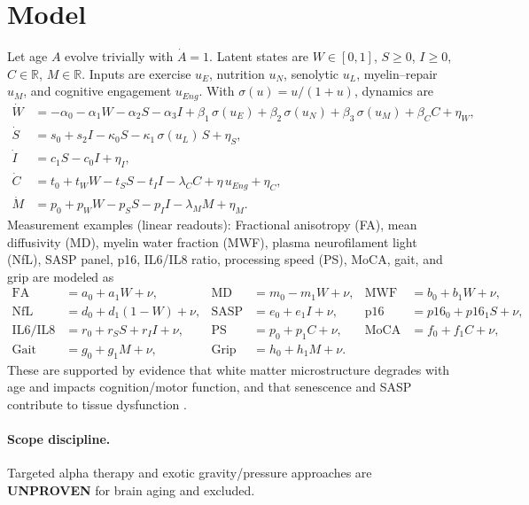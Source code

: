 \documentclass[11pt]{article}
\begin{document}
\section{Model}
Let age \(A\) evolve trivially with \(\dot A=1\). Latent states are \(W\in[0,1]\), \(S\ge0\), \(I\ge0\), \(C\in\mathbb{R}\), \(M\in\mathbb{R}\). Inputs are exercise \(u_E\), nutrition \(u_N\), senolytic \(u_L\), myelin--repair \(u_M\), and cognitive engagement \(u_{Eng}\). With \(\sigma(u)=u/(1+u)\), dynamics are
\begin{align}
\dot W &= -\alpha_0 - \alpha_1 W - \alpha_2 S - \alpha_3 I + \beta_1\,\sigma(u_E) + \beta_2\,\sigma(u_N) + \beta_3\,\sigma(u_M) + \beta_C C + \eta_W, \\
\dot S &= s_0 + s_2 I - \kappa_0 S - \kappa_1\,\sigma(u_L)\,S + \eta_S, \\
\dot I &= c_1 S - c_0 I + \eta_I, \\
\dot C &= t_0 + t_W W - t_S S - t_I I - \lambda_C C + \eta\,u_{Eng} + \eta_C, \\
\dot M &= p_0 + p_W W - p_S S - p_I I - \lambda_M M + \eta_M.
\end{align}
Measurement examples (linear readouts): Fractional anisotropy (FA), mean diffusivity (MD), myelin water fraction (MWF), plasma neurofilament light (NfL), SASP panel, p16, IL6/IL8 ratio, processing speed (PS), MoCA, gait, and grip are modeled as
\begin{align}
\mathrm{FA}&=a_0+a_1 W+\nu, & \mathrm{MD}&=m_0-m_1 W+\nu, & \mathrm{MWF}&=b_0+b_1 W+\nu,\\
\mathrm{NfL}&=d_0+d_1(1-W)+\nu, & \mathrm{SASP}&=e_0+e_1 I+\nu, & \mathrm{p16}&=p16_0+p16_1 S+\nu,\\
\mathrm{IL6/IL8}&=r_0+r_S S+r_I I+\nu, & \mathrm{PS}&=p_0+p_1 C+\nu, & \mathrm{MoCA}&=f_0+f_1 C+\nu,\\
\mathrm{Gait}&=g_0+g_1 M+\nu, & \mathrm{Grip}&=h_0+h_1 M+\nu.
\end{align}
These are supported by evidence that white matter microstructure degrades with age and impacts cognition/motor function, and that senescence and SASP contribute to tissue dysfunction \cite{WhiteMatterAging_PLACEHOLDER,SASPReview_PLACEHOLDER,DTI_MWF_Biomarkers_PLACEHOLDER,NFL_Aging_PLACEHOLDER}.

\paragraph{Scope discipline.} Targeted alpha therapy and exotic gravity/pressure approaches are \textbf{UNPROVEN} for brain aging and excluded.
\end{document}
